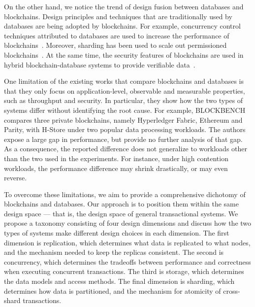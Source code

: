 On the other hand, we notice the trend of design fusion between databases and
blockchains. Design principles and techniques that are traditionally used by
databases are being adopted by blockchains. For example, concurrency control
techniques attributed to databases are used to increase the performance of
blockchains~\cite{sharma2019blurring, ruan2020transactional,
dickerson2017adding}. Moreover, sharding has been used to scale out permissioned
blockchains~\cite{dang2018towards}. At the same time, the security features of
blockchains are used in hybrid blockchain-database systems to provide verifiable
data~\cite{el2019blockchaindb, veritas, peng2020falcondb}.


One limitation of the existing works that compare blockchains and databases is
that they only focus on application-level, observable and measurable properties,
such as throughput and security. In particular, they show how the two types of
systems differ without identifying the root cause. For example,
BLOCKBENCH~\cite{dinh2017blockbench} compares three private blockchains, namely
Hyperledger Fabric, Ethereum and Parity, with H-Store under two popular data
processing workloads. The authors expose a large gap in performance, but provide
no further analysis of that gap. As a consequence, the reported difference does
not generalize to workloads other than the two used in the experiments. For
instance, under high contention workloads, the performance difference may shrink
drastically, or may even reverse.

To overcome these limitations, we aim to provide a comprehensive dichotomy of
blockchains and databases. Our approach is to position them within the same
design space --- that is, the design space of general transactional systems. We
propose a taxonomy consisting of four design dimensions and discuss how the two
types of systems make different design choices in each dimension. The first
dimension is replication, which determines what data is replicated to what
nodes, and the mechanism needed to keep the replicas consistent. The second is
concurrency, which determines the tradeoffs between performance and correctness
when executing concurrent transactions. The third is storage, which determines
the data models and access methods. The final dimension is sharding, which
determines how data is partitioned, and the mechanism for atomicity of
cross-shard transactions.

